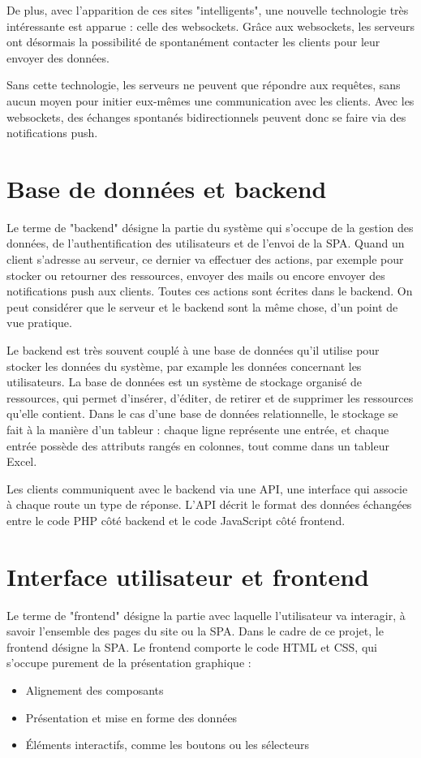 \documentclass[
    iai, %
    eai, %
]{heig-tb}
\begin{document}
\newpage
De plus, avec l'apparition de ces sites "intelligents", une nouvelle technologie très intéressante est apparue : celle des websockets.
Grâce aux websockets, les serveurs ont désormais la possibilité de spontanément contacter les clients pour leur envoyer des données.

Sans cette technologie, les serveurs ne peuvent que répondre aux requêtes, sans aucun moyen pour initier eux-mêmes une communication avec les clients.
Avec les websockets, des échanges spontanés bidirectionnels peuvent donc se faire via des notifications push.

\section{Base de données et backend}
Le terme de "backend" désigne la partie du système qui s'occupe de la gestion des données, de l'authentification des utilisateurs et de l'envoi de la SPA.
Quand un client s'adresse au serveur, ce dernier va effectuer des actions, par exemple pour stocker ou retourner des ressources, envoyer des mails ou encore envoyer des notifications push aux clients. Toutes ces actions sont écrites dans le backend. On peut considérer que le serveur et le backend sont la même chose, d'un point de vue pratique.

Le backend est très souvent couplé à une base de données qu'il utilise pour stocker les données du système, par example les données concernant les utilisateurs.
La base de données est un système de stockage organisé de ressources, qui permet d'insérer, d'éditer, de retirer et de supprimer les ressources qu'elle contient.
Dans le cas d'une base de données relationnelle, le stockage se fait à la manière d'un tableur : chaque ligne représente une entrée, et chaque entrée possède des attributs rangés en colonnes, tout comme dans un tableur Excel.

Les clients communiquent avec le backend via une API, une interface qui associe à chaque route un type de réponse.
L'API décrit le format des données échangées entre le code PHP côté backend et le code JavaScript côté frontend.

\newpage

\section{Interface utilisateur et frontend}
Le terme de "frontend" désigne la partie avec laquelle l'utilisateur va interagir, à savoir l'ensemble des pages du site ou la SPA. Dans le cadre de ce projet, le frontend désigne la SPA.
Le frontend comporte le code HTML et CSS, qui s'occupe purement de la présentation graphique :
\begin{itemize}
  \item Alignement des composants
  \item Présentation et mise en forme des données
  \item Éléments interactifs, comme les boutons ou les sélecteurs
\end{itemize}
\bigskip
\end{document}
